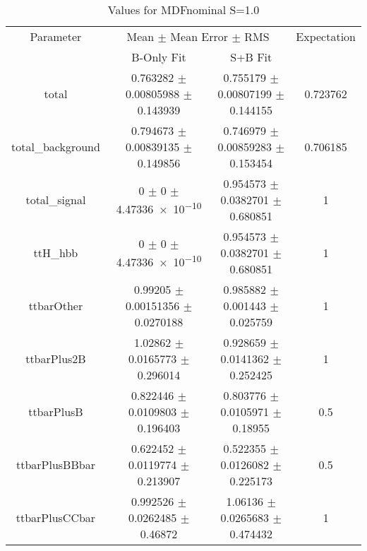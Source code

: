 \begin{table}
\centering
\caption{Values for MDFnominal S=1.0}
\begin{tabular}{cccc}
\toprule
Parameter & \multicolumn{2}{c}{Mean $\pm$ Mean Error $\pm$ RMS} & Expectation\\
 & B-Only Fit & S+B Fit & \\
\midrule
total & \num{0.763282} $\pm$ \num{0.00805988} $\pm$ \num{0.143939} & \num{0.755179} $\pm$ \num{0.00807199} $\pm$ \num{0.144155} & \num{0.723762}\\
total\_background & \num{0.794673} $\pm$ \num{0.00839135} $\pm$ \num{0.149856} & \num{0.746979} $\pm$ \num{0.00859283} $\pm$ \num{0.153454} & \num{0.706185}\\
total\_signal & \num{0} $\pm$ \num{0} $\pm$ \num{4.47336e-10} & \num{0.954573} $\pm$ \num{0.0382701} $\pm$ \num{0.680851} & \num{1}\\
ttH\_hbb & \num{0} $\pm$ \num{0} $\pm$ \num{4.47336e-10} & \num{0.954573} $\pm$ \num{0.0382701} $\pm$ \num{0.680851} & \num{1}\\
ttbarOther & \num{0.99205} $\pm$ \num{0.00151356} $\pm$ \num{0.0270188} & \num{0.985882} $\pm$ \num{0.001443} $\pm$ \num{0.025759} & \num{1}\\
ttbarPlus2B & \num{1.02862} $\pm$ \num{0.0165773} $\pm$ \num{0.296014} & \num{0.928659} $\pm$ \num{0.0141362} $\pm$ \num{0.252425} & \num{1}\\
ttbarPlusB & \num{0.822446} $\pm$ \num{0.0109803} $\pm$ \num{0.196403} & \num{0.803776} $\pm$ \num{0.0105971} $\pm$ \num{0.18955} & \num{0.5}\\
ttbarPlusBBbar & \num{0.622452} $\pm$ \num{0.0119774} $\pm$ \num{0.213907} & \num{0.522355} $\pm$ \num{0.0126082} $\pm$ \num{0.225173} & \num{0.5}\\
ttbarPlusCCbar & \num{0.992526} $\pm$ \num{0.0262485} $\pm$ \num{0.46872} & \num{1.06136} $\pm$ \num{0.0265683} $\pm$ \num{0.474432} & \num{1}\\
\bottomrule
\end{tabular}
\end{table}